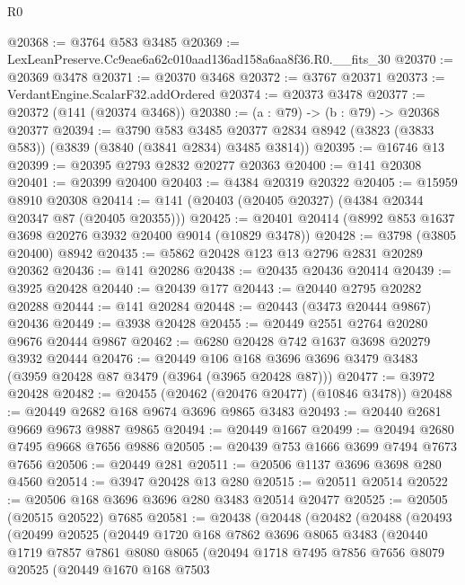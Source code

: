 \begin{lexlean}{R0}
\begin{coremodule}
@20368 := @3764 @583 @3485
@20369 := LexLeanPreserve.Cc9eae6a62c010aad136ad158a6aa8f36.R0.__fits_30
@20370 := @20369 @3478
@20371 := @20370 @3468
@20372 := @3767 @20371
@20373 := VerdantEngine.ScalarF32.addOrdered
@20374 := @20373 @3478
@20377 := @20372 (@141 (@20374 @3468))
@20380 := (a : @79) -> (b : @79) -> @20368 @20377
@20394 := @3790
    @583
    @3485
    @20377
    @2834
    @8942
    (@3823 (@3833 @583))
    (@3839 (@3840 (@3841 @2834) @3485 @3814))
@20395 := @16746 @13
@20399 := @20395 @2793 @2832 @20277 @20363
@20400 := @141 @20308
@20401 := @20399 @20400
@20403 := @4384 @20319 @20322
@20405 := @15959 @8910 @20308
@20414 := @141 (@20403 (@20405 @20327) (@4384 @20344 @20347 @87 (@20405 @20355)))
@20425 := @20401 @20414 (@8992 @853 @1637 @3698 @20276 @3932 @20400 @9014 (@10829 @3478))
@20428 := @3798 (@3805 @20400) @8942
@20435 := @5862 @20428 @123 @13 @2796 @2831 @20289 @20362
@20436 := @141 @20286
@20438 := @20435 @20436 @20414
@20439 := @3925 @20428
@20440 := @20439 @177
@20443 := @20440 @2795 @20282 @20288
@20444 := @141 @20284
@20448 := @20443 (@3473 @20444 @9867) @20436
@20449 := @3938 @20428
@20455 := @20449 @2551 @2764 @20280 @9676 @20444 @9867
@20462 := @6280 @20428 @742 @1637 @3698 @20279 @3932 @20444
@20476 := @20449
    @106
    @168
    @3696
    @3696
    @3479
    @3483
    (@3959 @20428 @87 @3479 (@3964 (@3965 @20428 @87)))
@20477 := @3972 @20428
@20482 := @20455 (@20462 (@20476 @20477) (@10846 @3478))
@20488 := @20449 @2682 @168 @9674 @3696 @9865 @3483
@20493 := @20440 @2681 @9669 @9673 @9887 @9865
@20494 := @20449 @1667
@20499 := @20494 @2680 @7495 @9668 @7656 @9886
@20505 := @20439 @753 @1666 @3699 @7494 @7673 @7656
@20506 := @20449 @281
@20511 := @20506 @1137 @3696 @3698 @280 @4560
@20514 := @3947 @20428 @13 @280
@20515 := @20511 @20514
@20522 := @20506 @168 @3696 @3696 @280 @3483 @20514 @20477
@20525 := @20505 (@20515 @20522) @7685
@20581 := @20438
    (@20448
      (@20482
        (@20488
          (@20493
            (@20499
              @20525
              (@20449
                @1720
                @168
                @7862
                @3696
                @8065
                @3483
                (@20440
                  @1719
                  @7857
                  @7861
                  @8080
                  @8065
                  (@20494
                    @1718
                    @7495
                    @7856
                    @7656
                    @8079
                    @20525
                    (@20449
                      @1670
                      @168
                      @7503

\end{coremodule}
\end{lexlean}
